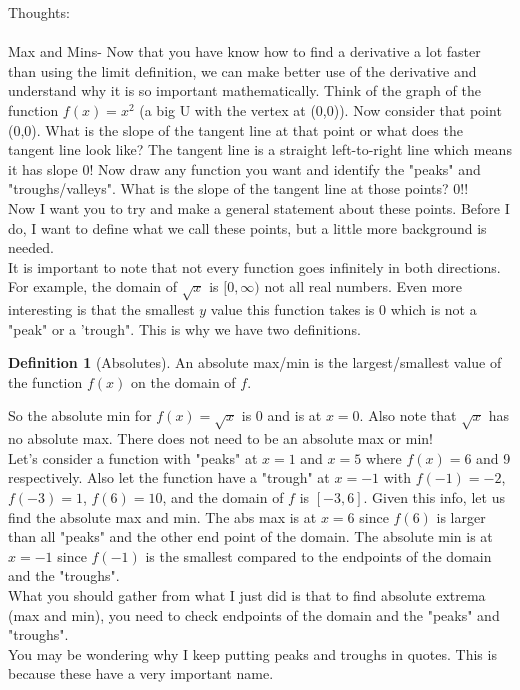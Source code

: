 \documentclass[10pt]{article}
\theoremstyle{Theorem}
\theoremstyle{definition}
\newtheorem{definition}{Definition}[section]
\theoremstyle{remark}
\theoremstyle{custom}
\begin{document}
\thispagestyle{firststyle}
\pagestyle{plain}

Thoughts:\\\\
Max and Mins- Now that you have know how to find a derivative a lot faster than using the limit definition, we can make better use of the derivative and understand why it is so important mathematically. Think of the graph of the function $f(x)=x^2$ (a big U with the vertex at (0,0)). Now consider that point (0,0). What is the slope of the tangent line at that point or what does the tangent line look like? The tangent line is a straight left-to-right line which means it has slope 0! Now draw any function you want and identify the "peaks" and "troughs/valleys". What is the slope of the tangent line at those points? 0!!\\
Now I want you to try and make a general statement about these points. Before I do, I want to define what we call these points, but a little more background is needed.\\
It is important to note that not every function goes infinitely in both directions. For example, the domain of $\sqrt{x}$ is $[0, \infty)$ not all real numbers. Even more interesting is that the smallest $y$ value this function takes is 0 which is not a "peak" or a 'trough". This is why we have two definitions.
\begin{definition}[Absolutes]
An absolute max/min is the largest/smallest value of the function $f(x)$ on the domain of $f$. 
\end{definition}
So the absolute min for $f(x)=\sqrt{x}$ is 0 and is at $x=0$. Also note that $\sqrt{x}$ has no absolute max. There does not need to be an absolute max or min!\\
Let's consider a function with "peaks" at $x=1$ and $x=5$ where $f(x)=6$ and 9 respectively. Also let the function have a "trough" at $x=-1$ with $f(-1)=-2$, $f(-3)=1$, $f(6)=10$, and the domain of $f$ is $[-3, 6]$. Given this info, let us find the absolute max and min. The abs max is at $x=6$ since $f(6)$ is larger than all "peaks" and the other end point of the domain. The absolute min is at $x=-1$ since $f(-1)$ is the smallest compared to the endpoints of the domain and the "troughs".\\
What you should gather from what I just did is that to find absolute extrema (max and min), you need to check endpoints of the domain and the "peaks" and "troughs".\\
You may be wondering why I keep putting peaks and troughs in quotes. This is because these have a very important name.
\end{document}
